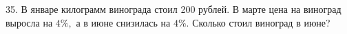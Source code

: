 35. В январе килограмм винограда стоил 200 рублей. В марте цена на виноград выросла на $4\%,$ а в июне снизилась на $4\%.$ Сколько стоил виноград в июне?\\

